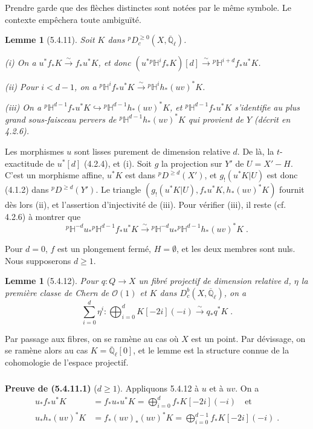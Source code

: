 \documentclass[12pt,a4paper]{article}
\theoremstyle{plain}
\newtheorem{lemma}[theorem]{Lemme}
\theoremstyle{definition}
\theoremstyle{remark}
\newcommand{\HH}{\mathbb{H}}
\newcommand{\QQ}{\mathbb{Q}}
\newcommand{\cO}{\mathcal{O}}
\begin{document}
Prendre garde que des fl\`eches distinctes sont not\'ees par le m\^eme symbole. Le contexte emp\^echera toute ambigu\"it\'e.

\begin{lemma}[5.4.11]
Soit $K$ dans ${}^{p}D^{\geq 0}_c(X, \overline{\QQ}_{\ell})$.

\emph{(i)} On a $u^*f_*K \xrightarrow{\sim} f_*u^*K$, et donc $(u^*{}^{p}\HH^if_*K)[d] \xrightarrow{\sim} {}^{p}\HH^{i+d}f_*u^*K$.

\emph{(ii)} Pour $i < d-1$, on a ${}^{p}\HH^if_*u^*K \xrightarrow{\sim} {}^{p}\HH^ih_*(uv)^*K$.

\emph{(iii)} On a ${}^{p}\HH^{d-1}f_*u^*K \hookrightarrow {}^{p}\HH^{d-1}h_*(uv)^*K$, et ${}^{p}\HH^{d-1}f_*u^*K$ s'identifie au plus grand sous-faisceau pervers de ${}^{p}\HH^{d-1}h_*(uv)^*K$ qui provient de $Y$ (d\'ecrit en 4.2.6).
\end{lemma}

Les morphismes $u$ sont lisses purement de dimension relative $d$. De l\`a, la $t$-exactitude de $u^*[d]$ (4.2.4), et (i). Soit $g$ la projection sur $Y'$ de $U = X' - H$. C'est un morphisme affine, $u^*K$ est dans ${}^{p}D^{\geq d}(X')$, et $g_!(u^*K|U)$ est donc (4.1.2) dans ${}^{p}D^{\geq d}(Y')$. Le triangle $(g_!(u^*K|U), f_*u^*K, h_*(uv)^*K)$ fournit d\`es lors (ii), et l'assertion d'injectivit\'e de (iii). Pour v\'erifier (iii), il reste (cf. 4.2.6) \`a montrer que
\begin{equation}\label{eq:5.4.11.1}
{}^{p}\HH^{-d}u_*{}^{p}\HH^{d-1}f_*u^*K \xrightarrow{\sim} {}^{p}\HH^{-d}u_*{}^{p}\HH^{d-1}h_*(uv)^*K\;.
\end{equation}

Pour $d = 0$, $f$ est un plongement ferm\'e, $H = \emptyset$, et les deux membres sont nuls. Nous supposerons $d \geq 1$.

\begin{lemma}[5.4.12]
Pour $q: Q \to X$ un fibr\'e projectif de dimension relative $d$, $\eta$ la premi\`ere classe de Chern de $\cO(1)$ et $K$ dans $D^b_c(X, \overline{\QQ}_{\ell})$, on a
\[
\sum_{i=0}^{d} \eta^i: \bigoplus_{i=0}^{d} K[-2i](-i) \xrightarrow{\sim} q_*q^*K\;.
\]
\end{lemma}

Par passage aux fibres, on se ram\`ene au cas o\`u $X$ est un point. Par d\'evissage, on se ram\`ene alors au cas $K = \overline{\QQ}_{\ell}[0]$, et le lemme est la structure connue de la cohomologie de l'espace projectif.

\subsubsection{}
\textbf{Preuve de (5.4.11.1)} ($d \geq 1$). Appliquons 5.4.12 \`a $u$ et \`a $uv$. On a
\begin{align*}
u_*f_*u^*K &= f_*u_*u^*K = \bigoplus_{i=0}^{d} f_*K[-2i](-i) \quad \text{et} \\
u_*h_*(uv)^*K &= f_*(uv)_*(uv)^*K = \bigoplus_{i=0}^{d-1} f_*K[-2i](-i)\;.
\end{align*}
\end{document}
